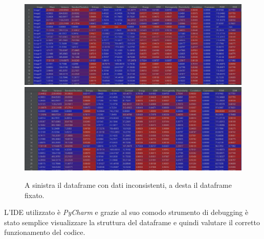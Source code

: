 \begin{figure}[!htb]
	\includegraphics[width=1.2\linewidth]{image/braintumordataset.png}
	\label{fig:immagine01}
	\endminipage\hfill
	\includegraphics[width=1.2\linewidth]{image/braintumordatasetfixed.png}
	\label{fig:immagine2}
	\endminipage
	\caption{A sinistra il dataframe con dati inconsistenti, a desta il dataframe fixato.}
\end{figure}
\newpage
L'IDE utilizzato è \textit{PyCharm} e grazie al suo comodo strumento di debugging è stato semplice visualizzare la struttura del dataframe e quindi valutare il corretto funzionamento del codice. 